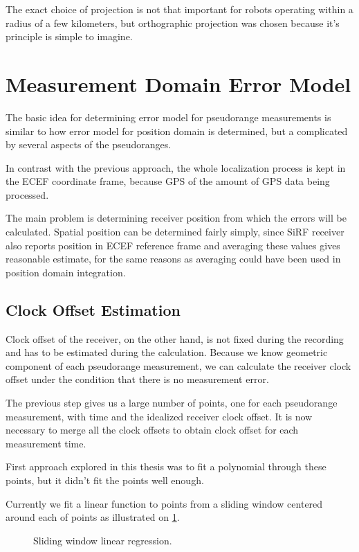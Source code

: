 The exact choice of projection is not that important for robots operating within
a radius of a few kilometers, but orthographic projection was chosen because
it's principle is simple to imagine.

\section{Measurement Domain Error Model}
The basic idea for determining error model for pseudorange measurements is
similar to how error model for position domain is determined, but a complicated
by several aspects of the pseudoranges.

In contrast with the previous approach, the whole localization process is kept in
the ECEF coordinate frame, because GPS of the amount of GPS data being processed.

The main problem is determining receiver position from which the errors will be
calculated.
Spatial position can be determined fairly simply, since SiRF receiver also
reports position in ECEF reference frame and averaging these values gives
reasonable estimate, for the same reasons as averaging could have been used in
position domain integration.

\subsection{Clock Offset Estimation}
Clock offset of the receiver, on the other hand, is not fixed during the recording
and has to be estimated during the calculation.
Because we know geometric component of each pseudorange measurement, we can
calculate the receiver clock offset under the condition that there is no measurement
error.

The previous step gives us a large number of points, one for each pseudorange
measurement, with time and the idealized receiver clock offset.
It is now necessary to merge all the clock offsets to obtain clock offset for
each measurement time.

First approach explored in this thesis was to fit a polynomial through these
points, but it didn't fit the points well enough.

Currently we fit a linear function to points from a sliding window centered
around each of points as illustrated on \cref{fig:sliding-window-linear-regression}.

\begin{figure}[h]
	\centering
	
	\caption{Sliding window linear regression.}
	\label{fig:sliding-window-linear-regression}
\end{figure}

